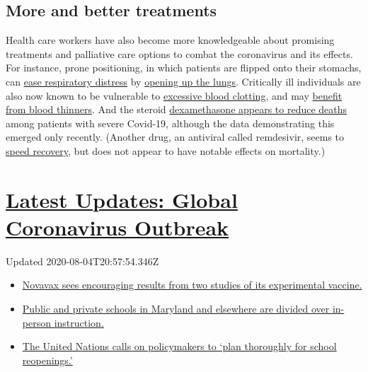 \hypertarget{more-and-better-treatments}{%
\subsection{More and better
treatments}\label{more-and-better-treatments}}

Health care workers have also become more knowledgeable about promising
treatments and palliative care options to combat the coronavirus and its
effects. For instance, prone positioning, in which patients are flipped
onto their stomachs, can
\href{https://jamanetwork.com/journals/jamainternalmedicine/fullarticle/2767575}{ease
respiratory distress} by
\href{https://www.nytimes.com/2020/05/13/health/coronavirus-proning-lungs.html}{opening
up the lungs}. Critically ill individuals are also now known to be
vulnerable to
\href{https://www.nytimes.com/2020/05/14/health/coronavirus-strokes.html}{excessive
blood clotting}, and may
\href{https://ashpublications.org/blood/article/135/23/2033/454646/COVID-19-and-its-implications-for-thrombosis-and}{benefit
from blood thinners}. And the steroid
\href{https://www.nytimes.com/2020/06/16/world/europe/dexamethasone-coronavirus-covid.html}{dexamethasone
appears to reduce deaths} among patients with severe Covid-19, although
the data demonstrating this emerged only recently. (Another drug, an
antiviral called remdesivir, seems to
\href{https://www.nytimes.com/2020/05/23/health/coronavirus-remdesivir.html}{speed
recovery}, but does not appear to have notable effects on mortality.)

\hypertarget{latest-updates-global-coronavirus-outbreak}{%
\section{\texorpdfstring{\href{https://www.nytimes.com/2020/08/04/world/coronavirus-cases.html?action=click\&pgtype=Article\&state=default\&region=MAIN_CONTENT_1\&context=storylines_live_updates}{Latest
Updates: Global Coronavirus
Outbreak}}{Latest Updates: Global Coronavirus Outbreak}}\label{latest-updates-global-coronavirus-outbreak}}

Updated 2020-08-04T20:57:54.346Z

\begin{itemize}
\tightlist
\item
  \href{https://www.nytimes.com/2020/08/04/world/coronavirus-cases.html?action=click\&pgtype=Article\&state=default\&region=MAIN_CONTENT_1\&context=storylines_live_updates\#link-1228a480}{Novavax
  sees encouraging results from two studies of its experimental
  vaccine.}
\item
  \href{https://www.nytimes.com/2020/08/04/world/coronavirus-cases.html?action=click\&pgtype=Article\&state=default\&region=MAIN_CONTENT_1\&context=storylines_live_updates\#link-4825b93}{Public
  and private schools in Maryland and elsewhere are divided over
  in-person instruction.}
\item
  \href{https://www.nytimes.com/2020/08/04/world/coronavirus-cases.html?action=click\&pgtype=Article\&state=default\&region=MAIN_CONTENT_1\&context=storylines_live_updates\#link-50f7386d}{The
  United Nations calls on policymakers to `plan thoroughly for school
  reopenings.'}
\end{itemize}

